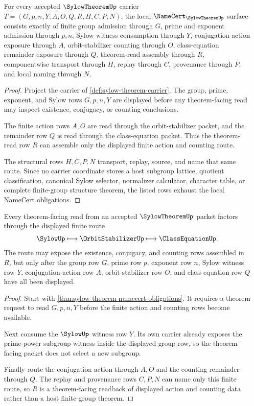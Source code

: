 \begin{theorem}
\label{thm:sylow-theorem-namecert-obligations}
For every accepted $\SylowTheoremUp$ carrier $T=(G,p,n,Y,A,O,Q,R,H,C,P,N)$, the local $\NameCert_{\SylowTheoremUp}$ surface consists exactly of finite group admission through $G$, prime and exponent admission through $p,n$, Sylow witness consumption through $Y$, conjugation-action exposure through $A$, orbit-stabilizer counting through $O$, class-equation remainder exposure through $Q$, theorem-read assembly through $R$, componentwise transport through $H$, replay through $C$, provenance through $P$, and local naming through $N$.
\end{theorem}
\begin{proof}
Project the carrier of \autoref{def:sylow-theorem-carrier}. The group, prime, exponent, and Sylow rows $G,p,n,Y$ are displayed before any theorem-facing read may inspect existence, conjugacy, or counting conclusions.

The finite action rows $A,O$ are read through the orbit-stabilizer packet, and the remainder row $Q$ is read through the class-equation packet. Thus the theorem-read row $R$ can assemble only the displayed finite action and counting route.

The structural rows $H,C,P,N$ transport, replay, source, and name that same route. Since no carrier coordinate stores a host subgroup lattice, quotient classification, canonical Sylow selector, normalizer calculator, character table, or complete finite-group structure theorem, the listed rows exhaust the local NameCert obligations.
\end{proof}

\begin{theorem}
\label{thm:sylow-theorem-finite-action-route}
Every theorem-facing read from an accepted $\SylowTheoremUp$ packet factors through the displayed finite route
$$
\SylowUp\longmapsto \OrbitStabilizerUp\longmapsto \ClassEquationUp.
$$
The route may expose the existence, conjugacy, and counting rows assembled in $R$, but only after the group row $G$, prime row $p$, exponent row $n$, Sylow witness row $Y$, conjugation-action row $A$, orbit-stabilizer row $O$, and class-equation row $Q$ have all been displayed.
\end{theorem}
\begin{proof}
Start with \autoref{thm:sylow-theorem-namecert-obligations}. It requires a theorem request to read $G,p,n,Y$ before the finite action and counting rows become available.

Next consume the $\SylowUp$ witness row $Y$. Its own carrier already exposes the prime-power subgroup witness inside the displayed group row, so the theorem-facing packet does not select a new subgroup.

Finally route the conjugation action through $A,O$ and the counting remainder through $Q$. The replay and provenance rows $C,P,N$ can name only this finite route, so $R$ is a theorem-facing readback of displayed action and counting data rather than a host finite-group theorem.
\end{proof}

